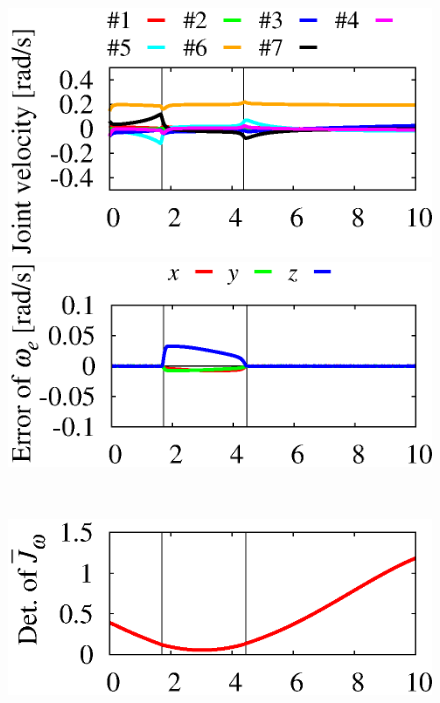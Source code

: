 \begin{figure}[t]
  \centering
  \begin{minipage}[h]{0.40\linewidth}
    \centering
    \includegraphics[width=1.0\linewidth]{fig/chapter4/inspection/singularity/DLS/U01_joint_velo.eps}
  \end{minipage}
  \begin{minipage}[h]{0.40\linewidth}
    \centering
    \includegraphics[width=1.0\linewidth]{fig/chapter4/inspection/singularity/DLS/U20_EE_vel_error.eps}
  \end{minipage}\\
  \vspace{-7mm}
  \begin{minipage}[h]{0.40\linewidth}
    \centering
    \includegraphics[width=1.0\linewidth]{fig/chapter4/inspection/singularity/DLS/U16_determinant_Gw.eps}

\end{minipage}
\end{figure}

